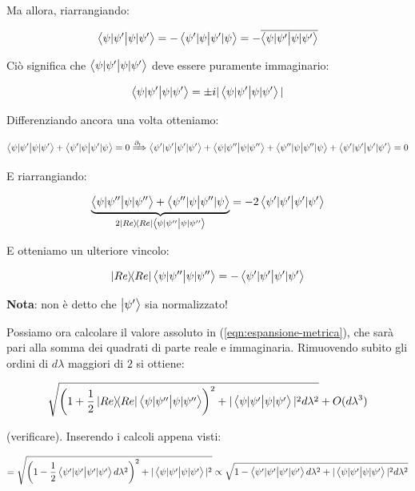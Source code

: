 \documentclass[main.tex]{subfiles}
\begin{document}
Ma allora, riarrangiando:

\begin{align*}
\braket{\psi|\psi'} = - \braket{\psi'|\psi} = - \overline{\braket{\psi|\psi'}}
\end{align*}

Ciò significa che $\braket{\psi|\psi'}$ deve essere puramente immaginario:

\begin{align*}
\braket{\psi|\psi'} = \pm i |\braket{\psi|\psi'}|
\end{align*}

Differenziando ancora una volta otteniamo:

\begin{align*}
 \braket{\psi|\psi'} + \braket{\psi'|\psi} =0 \xRightarrow{\partial_t} \braket{\psi'|\psi'} + \braket{\psi|\psi''} + \braket{\psi''|\psi} + \braket{\psi'|\psi'} = 0
\end{align*}

E riarrangiando:

\begin{align*}
\underbrace{\braket{\psi|\psi''} + \braket{\psi''|\psi}}_{2\op{Re}\braket{\psi|\psi''}} = -2\braket{\psi'|\psi'}
\end{align*}

E otteniamo un ulteriore vincolo:

\begin{align*}
\op{Re}\braket{\psi|\psi''} = -\braket{\psi'|\psi'}
\end{align*}

\textbf{Nota}: non è detto che $\ket{\psi'}$ sia normalizzato!

Possiamo ora calcolare il valore assoluto in (\ref{eqn:espansione-metrica}), che sarà pari alla somma dei quadrati di parte reale e immaginaria. Rimuovendo subito gli ordini di $d\lambda$ maggiori di $2$ si ottiene:

\begin{align*}
\sqrt{\left(1+\frac{1}{2}\op{Re}\braket{\psi|\psi''}\right)^2 + |\braket{\psi|\psi'}|^2 d\lambda^2} + O(d\lambda^3)
\end{align*}

(verificare). Inserendo i calcoli appena visti:

\begin{align*}
= \sqrt{\left(1-\frac{1}{2}\braket{\psi'|\psi'} d\lambda^2\right)^2 + |\braket{\psi|\psi'}|^2 } \propto \sqrt{1-\braket{\psi'|\psi' }d\lambda^2 + |\braket{\psi|\psi'}|^2 d\lambda^2}
\end{align*}
\end{document}

